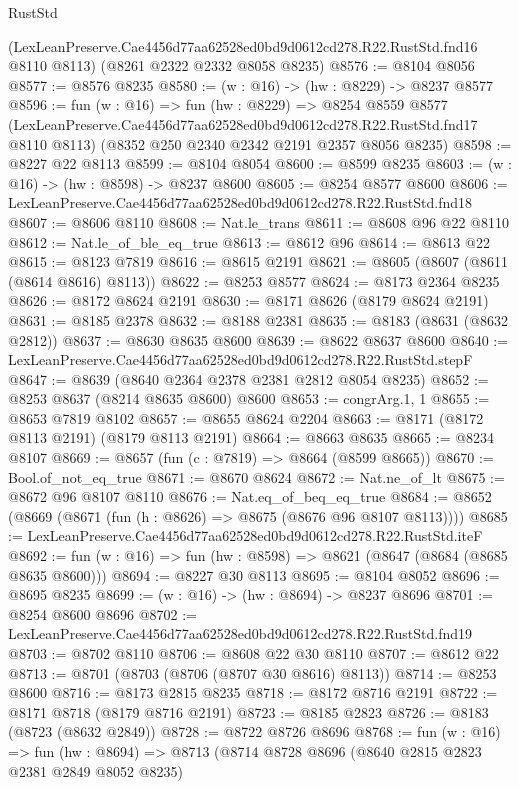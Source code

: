 \begin{lexlean}{RustStd}
\begin{coremodule}
    (LexLeanPreserve.Cae4456d77aa62528ed0bd9d0612cd278.R22.RustStd.fnd16 @8110 @8113)
    (@8261 @2322 @2332 @8058 @8235)
@8576 := @8104 @8056
@8577 := @8576 @8235
@8580 := (w : @16) -> (hw : @8229) -> @8237 @8577
@8596 := fun (w : @16) =>
  fun (hw : @8229) =>
  @8254
    @8559
    @8577
    (LexLeanPreserve.Cae4456d77aa62528ed0bd9d0612cd278.R22.RustStd.fnd17 @8110 @8113)
    (@8352 @250 @2340 @2342 @2191 @2357 @8056 @8235)
@8598 := @8227 @22 @8113
@8599 := @8104 @8054
@8600 := @8599 @8235
@8603 := (w : @16) -> (hw : @8598) -> @8237 @8600
@8605 := @8254 @8577 @8600
@8606 := LexLeanPreserve.Cae4456d77aa62528ed0bd9d0612cd278.R22.RustStd.fnd18
@8607 := @8606 @8110
@8608 := Nat.le_trans
@8611 := @8608 @96 @22 @8110
@8612 := Nat.le_of_ble_eq_true
@8613 := @8612 @96
@8614 := @8613 @22
@8615 := @8123 @7819
@8616 := @8615 @2191
@8621 := @8605 (@8607 (@8611 (@8614 @8616) @8113))
@8622 := @8253 @8577
@8624 := @8173 @2364 @8235
@8626 := @8172 @8624 @2191
@8630 := @8171 @8626 (@8179 @8624 @2191)
@8631 := @8185 @2378
@8632 := @8188 @2381
@8635 := @8183 (@8631 (@8632 @2812))
@8637 := @8630 @8635 @8600
@8639 := @8622 @8637 @8600
@8640 := LexLeanPreserve.Cae4456d77aa62528ed0bd9d0612cd278.R22.RustStd.stepF
@8647 := @8639 (@8640 @2364 @2378 @2381 @2812 @8054 @8235)
@8652 := @8253 @8637 (@8214 @8635 @8600) @8600
@8653 := congrArg.{1, 1}
@8655 := @8653 @7819 @8102
@8657 := @8655 @8624 @2204
@8663 := @8171 (@8172 @8113 @2191) (@8179 @8113 @2191)
@8664 := @8663 @8635
@8665 := @8234 @8107
@8669 := @8657 (fun (c : @7819) => @8664 (@8599 @8665))
@8670 := Bool.of_not_eq_true
@8671 := @8670 @8624
@8672 := Nat.ne_of_lt
@8675 := @8672 @96 @8107 @8110
@8676 := Nat.eq_of_beq_eq_true
@8684 := @8652 (@8669 (@8671 (fun (h : @8626) => @8675 (@8676 @96 @8107 @8113))))
@8685 := LexLeanPreserve.Cae4456d77aa62528ed0bd9d0612cd278.R22.RustStd.iteF
@8692 := fun (w : @16) => fun (hw : @8598) => @8621 (@8647 (@8684 (@8685 @8635 @8600)))
@8694 := @8227 @30 @8113
@8695 := @8104 @8052
@8696 := @8695 @8235
@8699 := (w : @16) -> (hw : @8694) -> @8237 @8696
@8701 := @8254 @8600 @8696
@8702 := LexLeanPreserve.Cae4456d77aa62528ed0bd9d0612cd278.R22.RustStd.fnd19
@8703 := @8702 @8110
@8706 := @8608 @22 @30 @8110
@8707 := @8612 @22
@8713 := @8701 (@8703 (@8706 (@8707 @30 @8616) @8113))
@8714 := @8253 @8600
@8716 := @8173 @2815 @8235
@8718 := @8172 @8716 @2191
@8722 := @8171 @8718 (@8179 @8716 @2191)
@8723 := @8185 @2823
@8726 := @8183 (@8723 (@8632 @2849))
@8728 := @8722 @8726 @8696
@8768 := fun (w : @16) =>
  fun (hw : @8694) =>
  @8713
    (@8714
      @8728
      @8696
      (@8640 @2815 @2823 @2381 @2849 @8052 @8235)

\end{coremodule}
\end{lexlean}
